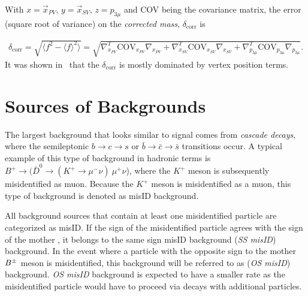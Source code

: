 With $x=\vec{{x}}_{PV}$, $y=\vec{{x}}_{SV}$, $z=p_{3\mu}$ and \rm{COV} being the covariance matrix, the error (square root of variance) on the \emph{corrected mass}, $\delta_\mathrm{{corr}}$ is
%
%


\begin{equation}
\begin{aligned}
	\delta_\mathrm{{corr}} = \sqrt{ \langle f^{2}-\langle f \rangle^{2} \rangle} = \sqrt{\nabla^{T}_{x_{PV}} {\mathrm{COV}}_{x_{PV}} \nabla_{x_{PV}} + \nabla^{T}_{x_{SV}} {\mathrm{COV}}_{x_{SV}} \nabla_{x_{SV}} + \nabla^{T}_{p_{3\mu}} {\mathrm{COV}}_{p_{3\mu}} \nabla_{p_{3\mu}}}. 
\end{aligned}
\end{equation}
It was shown in~\cite{Egede:1694339} that the $\delta_\mathrm{{corr}}$ is mostly dominated by vertex position terms.

\section{Sources of Backgrounds}
\label{bkgquick}
The largest background that looks similar to signal comes from \textit{cascade decays}, where the semileptonic $b \rightarrow c \rightarrow s$ or $\bar{b} \rightarrow \bar{c} \rightarrow \bar{s}$ transitions occur. A typical example of this type of background in hadronic terms is $B^{+} \rightarrow (\bar{D}^{0} \rightarrow (K^{+} \rightarrow \mu^{-} \nu)\ \mu^{+} \nu$), where the $K^{+}$ meson is subsequently misidentified as muon. Because the $K^{+}$ meson is misidentified as a muon, this type of background is denoted as misID background.

All background sources that contain at least one misidentified particle are categorized as misID. If the sign of the misidentified particle agrees with the sign of the mother \Bpm, it belongs to the same sign misID background (\textit{SS misID}) background. In the event where a particle with the opposite sign to the mother ${{B}^\pm}$ meson is misidentified, this background will be referred to as (\textit{OS misID}) background. \textit{OS misID} background is expected to have a smaller rate as the misidentified particle would have to proceed via decays with additional particles.

